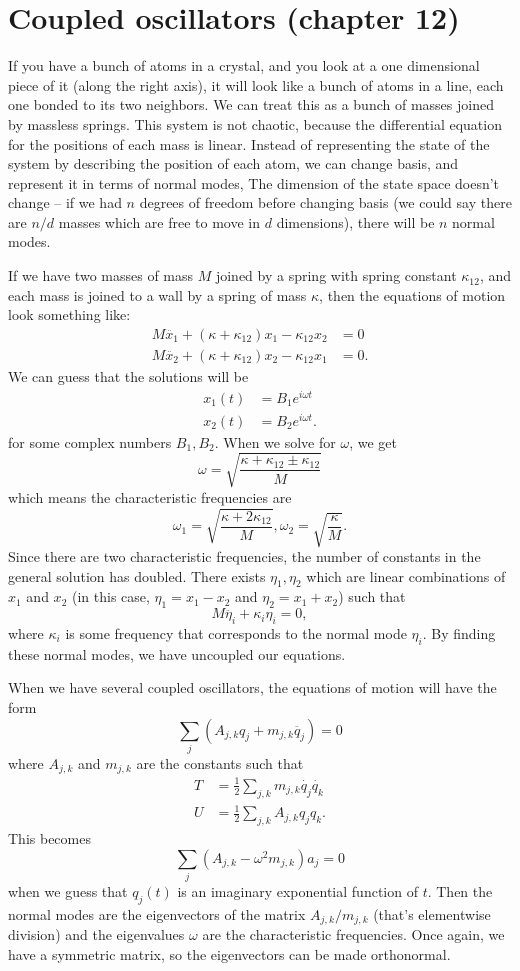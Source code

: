 \documentclass{article}
\begin{document}
\section{Coupled oscillators (chapter 12)}
If you have a bunch of atoms in a crystal, and you look at a one dimensional piece of it (along the right axis), it will look like a bunch of atoms in a line, each one bonded to its two neighbors. We can treat this as a bunch of masses joined by massless springs. This system is not chaotic, because the differential equation for the positions of each mass is linear. Instead of representing the state of the system by describing the position of each atom, we can change basis, and represent it in terms of normal modes, The dimension of the state space doesn't change -- if we had $n$ degrees of freedom before changing basis (we could say there are $n/d$ masses which are free to move in $d$ dimensions), there will be $n$ normal modes.
\par
If we have two masses of mass $M$ joined by a spring with spring constant $\kappa_{12}$, and each mass is joined to a wall by a spring of mass $\kappa$, then the equations of motion look something like:
\begin{align*}
    M \ddot{x_1} + (\kappa + \kappa_{12}) x_1 - \kappa_{12}x_2 &= 0 \\
    M \ddot{x_2} + (\kappa + \kappa_{12}) x_2 - \kappa_{12}x_1 &= 0.
\end{align*}
We can guess that the solutions will be
\begin{align*}
    x_1(t) &= B_1 e^{i \omega t} \\
    x_2(t) &= B_2 e^{i \omega t}.
\end{align*}
for some complex numbers $B_1, B_2$. When we solve for $\omega$, we get
\[ \omega = \sqrt{ \frac{\kappa + \kappa_{12} \pm \kappa_{12}}{M}} \]
which means the characteristic frequencies are
\[ \omega_1 = \sqrt{ \frac{\kappa+2\kappa_{12}}{M}}, \omega_2 = \sqrt{ \frac{\kappa}{M}}. \]
Since there are two characteristic frequencies, the number of constants in the general solution has doubled. There exists $\eta_1, \eta_2$ which are linear combinations of $x_1$ and $x_2$ (in this case, $\eta_1=x_1-x_2$ and $\eta_2=x_1+x_2$) such that
\[ M \ddot{\eta_i} + \kappa_i \eta_i = 0, \]
where $\kappa_i$ is some frequency that corresponds to the normal mode $\eta_i$. By finding these normal modes, we have uncoupled our equations.
\par
When we have several coupled oscillators, the equations of motion will have the form
\[ \sum_j \left( A_{j,k} q_j + m_{j,k} \ddot{q_j} \right) =0 \]
where $A_{j,k}$ and $m_{j,k}$ are the constants such that
\begin{align*}
    T &= \frac{1}{2} \sum_{j,k} m_{j,k} \dot{q_j} \dot{q_k} \\
    U &= \frac{1}{2} \sum_{j,k} A_{j,k} q_j q_k.
\end{align*}
This becomes
\[ \sum_j \left( A_{j,k} - \omega^2 m_{j,k} \right)a_j =0 \]
when we guess that $q_j(t)$ is an imaginary exponential function of $t$. Then the normal modes are the eigenvectors of the matrix $A_{j,k}/m_{j,k}$ (that's elementwise division) and the eigenvalues $\omega$ are the characteristic frequencies. Once again, we have a symmetric matrix, so the eigenvectors can be made orthonormal.
\end{document}
